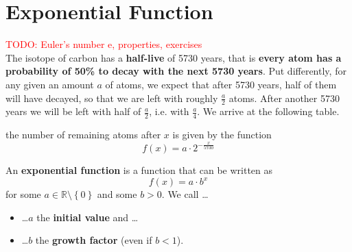 \section{Exponential Function}
\textcolor{red}{TODO: Euler's number e, properties, exercises}\\
The  isotope of carbon has a \textbf{half-live} of 5730 years, that is \textbf{every  atom has a probability of 50\% to decay with the next 5730 years}.
Put differently, for any given an amount $a$ of  atoms, we expect that after 5730 years, half of them will have decayed, so that we are left with roughly $\frac{a}{2}$ atoms.
After another 5730 years we will be left with half of $\frac{a}{2}$, i.e. with $\frac{a}{4}$.
We arrive at the following table.
\begin{figure}[ht]
	\centering
\end{figure}
the number of remaining atoms after $x$ is given by the function
\begin{equation*}
	f\left(x\right)=a\cdot 2^{-\frac{x}{5730}}
\end{equation*}
\begin{minipage}{0.48\textwidth}
	\centering
\end{minipage}\hfill
\begin{minipage}{0.48\textwidth}
	\centering
\end{minipage}
\begin{tcolorbox}
	An \textbf{exponential function} is a function that can be written as
	\begin{equation*}
		f\left(x\right)=a\cdot b^x
	\end{equation*}
	for some $a\in\mathbb R\setminus\left\{0\right\}$ and some $b>0$.
	We call \ldots
	\begin{itemize}
		\item[] \ldots$a$ the \textbf{initial value} and \ldots
		\item[] \ldots$b$ the \textbf{growth factor} (even if $b<1$).
	\end{itemize}
\end{tcolorbox}
